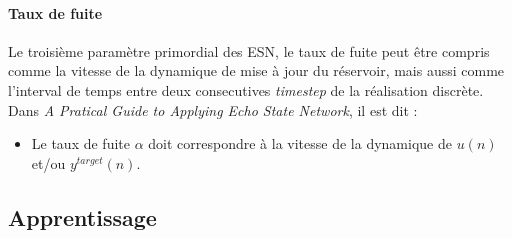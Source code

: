 \documentclass[12pt]{article}
\begin{document}
\paragraph{Taux de fuite}
Le troisième paramètre primordial des ESN, le taux de fuite peut être compris comme la vitesse de la dynamique de mise à jour du réservoir, mais aussi comme l'interval de temps entre deux consecutives \textit{timestep} de la réalisation discrète.\newline
Dans \textit{A Pratical Guide to Applying Echo State Network}, il est dit :
\begin{itemize}
\item Le taux de fuite $\alpha$ doit correspondre à la vitesse de la dynamique de $u(n)$ et/ou $y^{target}(n)$.
\end{itemize}

\subsection{Apprentissage}
\end{document}
